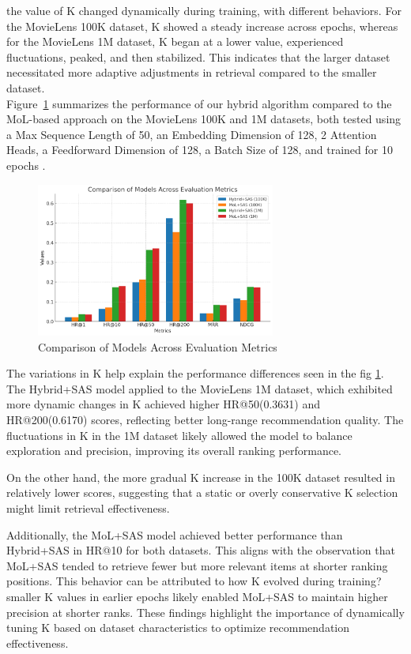 \documentclass[review]{jair}
\begin{document}
the value of K changed dynamically during training, with different behaviors. For the MovieLens 100K dataset, K showed a steady increase across epochs, whereas for the MovieLens 1M dataset, K began at a lower value, experienced fluctuations, peaked, and then stabilized. This indicates that the larger dataset necessitated more adaptive adjustments in retrieval compared to the smaller dataset.\\
Figure~\ref{histo_p} summarizes the performance of our hybrid algorithm compared to the MoL-based approach on the MovieLens 100K and 1M datasets, both tested using a Max Sequence Length of 50, an Embedding Dimension of 128, 2 Attention Heads, a Feedforward Dimension of 128, a Batch Size of 128, and trained for 10 epochs . \\
\begin{figure}[ht]
	\centering
	\includegraphics[width=0.7\textwidth]{HISTOGRAM.png}
	\caption{Comparison of Models Across Evaluation Metrics}\label{histo_p}
\end{figure}
The variations in K help explain the performance differences seen in the fig \ref{histo_p}. The Hybrid+SAS model applied to the MovieLens 1M dataset, which exhibited more dynamic changes in K achieved higher HR@50(0.3631) and HR@200(0.6170) scores, reflecting better long-range recommendation quality. The fluctuations in K in the 1M dataset likely allowed the model to balance exploration and precision, improving its overall ranking performance.

On the other hand, the more gradual K increase in the 100K dataset resulted in relatively lower scores, suggesting that a static or overly conservative 
K selection might limit retrieval effectiveness.

Additionally, the MoL+SAS model achieved better performance than Hybrid+SAS in HR@10 for both datasets. This aligns with the observation that MoL+SAS tended to retrieve fewer but more relevant items at shorter ranking positions. This behavior can be attributed to how K evolved during training?smaller K values in earlier epochs likely enabled MoL+SAS to maintain higher precision at shorter ranks.
These findings highlight the importance of dynamically tuning K based on dataset characteristics to optimize recommendation effectiveness.
\end{document}
